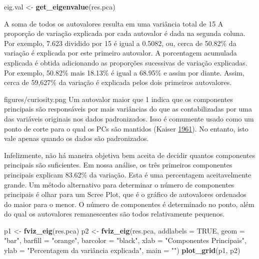 \documentclass[
]{book}
\newenvironment{Shaded}{\begin{snugshade}}{\end{snugshade}}
\newcommand{\DataTypeTok}[1]{\textcolor[rgb]{0.13,0.29,0.53}{#1}}
\newcommand{\KeywordTok}[1]{\textcolor[rgb]{0.13,0.29,0.53}{\textbf{#1}}}
\newcommand{\NormalTok}[1]{#1}
\newcommand{\OtherTok}[1]{\textcolor[rgb]{0.56,0.35,0.01}{#1}}
\newcommand{\StringTok}[1]{\textcolor[rgb]{0.31,0.60,0.02}{#1}}
\numberwithin{equation}{section}
\newcommand{\indt}[1]{\index{#1|ST}}
\newenvironment{vcsabia}
  {\begin{customBlockImage}[colframe=customGreen, title=Curiosidade]{figures/curiosity.png}}
  {\end{customBlockImage}}
\begin{document}
\begin{Shaded}
\begin{Highlighting}[]
\NormalTok{eig.val \textless{}{-}}\StringTok{ }\KeywordTok{get\_eigenvalue}\NormalTok{(res.pca)}
\end{Highlighting}
\end{Shaded}

A soma de todos os autovalores resulta em uma variância total de 15 A proporção de variação explicada por cada autovalor é dada na segunda coluna. Por exemplo, 7.623 dividido por 15 é igual a 0.5082, ou, cerca de 50.82\% da variação é explicada por este primeiro autovalor. A porcentagem acumulada explicada é obtida adicionando as proporções sucessivas de variação explicadas. Por exemplo, 50.82\% mais 18.13\% é igual a 68.95\% e assim por diante. Assim, cerca de 59,627\% da variação é explicada pelos dois primeiros autovalores.

\indt{Curiosidade}
\begin{vcsabia}
Um autovalor maior que 1 indica que os componentes principais são responsáveis por mais variâncias do que as contabilizadas por uma das variáveis originais nos dados padronizados. Isso é comumente usado como um ponto de corte para o qual os PCs são mantidos (Kaiser \protect\hyperlink{ref-Kaiser1961}{1961}). No entanto, isto vale apenas quando os dados são padronizados.
\end{vcsabia}

Infelizmente, não há maneira objetiva bem aceita de decidir quantos componentes principais são suficientes. Em nossa análise, os três primeiros componentes principais explicam 83.62\% da variação. Esta é uma percentagem aceitavelmente grande. Um método alternativo para determinar o número de componentes principais é olhar para um Scree Plot, que é o gráfico de autovalores ordenados do maior para o menor. O número de componentes é determinado no ponto, além do qual os autovalores remanescentes são todos relativamente pequenos.

\begin{Shaded}
\begin{Highlighting}[]
\NormalTok{p1 \textless{}{-}}\StringTok{ }\KeywordTok{fviz\_eig}\NormalTok{(res.pca)}
\NormalTok{p2 \textless{}{-}}\StringTok{ }\KeywordTok{fviz\_eig}\NormalTok{(res.pca,}
               \DataTypeTok{addlabels =} \OtherTok{TRUE}\NormalTok{,}
               \DataTypeTok{geom =} \StringTok{"bar"}\NormalTok{,}
               \DataTypeTok{barfill =} \StringTok{"orange"}\NormalTok{,}
               \DataTypeTok{barcolor =} \StringTok{"black"}\NormalTok{,}
               \DataTypeTok{xlab =} \StringTok{"Componentes Principais"}\NormalTok{,}
               \DataTypeTok{ylab =} \StringTok{"Percentagem da variância explicada"}\NormalTok{,}
               \DataTypeTok{main =} \StringTok{""}\NormalTok{)}
\KeywordTok{plot\_grid}\NormalTok{(p1, p2)}
\end{Highlighting}
\end{Shaded}
\end{document}
